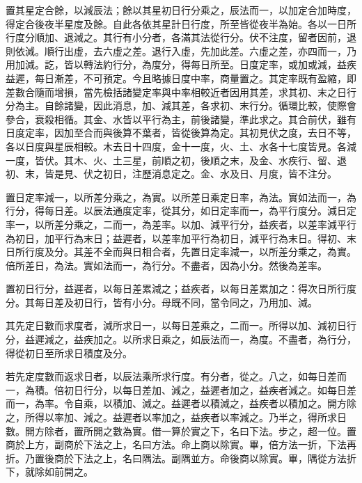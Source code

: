 \begin{pinyinscope}
 置其星定合餘，以減辰法；餘以其星初日行分乘之，辰法而一，以加定合加時度，得定合後夜半星度及餘。自此各依其星計日行度，所至皆從夜半為始。各以一日所行度分順加、退減之。其行有小分者，各滿其法從行分。伏不注度，留者因前，退則依減。順行出虛，去六虛之差。退行入虛，先加此差。六虛之差，亦四而一，乃用加減。訖，皆以轉法約行分，為度分，得每日所至。日度定率，或加或減，益疾益遲，每日漸差，不可預定。今且略據日度中率，商量置之。其定率既有盈縮，即差數合隨而增損，當先檢括諸變定率與中率相較近者因用其差，求其初、末之日行分為主。自餘諸變，因此消息，加、減其差，各求初、末行分。循環比較，使際會參合，衰殺相循。其金、水皆以平行為主，前後諸變，準此求之。其合前伏，雖有日度定率，因加至合而與後算不葉者，皆從後算為定。其初見伏之度，去日不等，各以日度與星辰相較。木去日十四度，金十一度，火、土、水各十七度皆見。各減一度，皆伏。其木、火、土三星，前順之初，後順之末，及金、水疾行、留、退初、末，皆是見、伏之初日，注歷消息定之。金、水及日、月度，皆不注分。



 置日定率減一，以所差分乘之，為實。以所差日乘定日率，為法。實如法而一，為行分，得每日差。以辰法通度定率，從其分，如日定率而一，為平行度分。減日定率一，以所差分乘之，二而一，為差率。以加、減平行分，益疾者，以差率減平行為初日，加平行為末日；益遲者，以差率加平行為初日，減平行為末日。得初、末日所行度及分。其差不全而與日相合者，先置日定率減一，以所差分乘之，為實。倍所差日，為法。實如法而一，為行分。不盡者，因為小分。然後為差率。



 置初日行分，益遲者，以每日差累減之；益疾者，以每日差累加之：得次日所行度分。其每日差及初日行，皆有小分。母既不同，當令同之，乃用加、減。



 其先定日數而求度者，減所求日一，以每日差乘之，二而一。所得以加、減初日行分，益遲減之，益疾加之。以所求日乘之，如辰法而一，為度。不盡者，為行分，得從初日至所求日積度及分。



 若先定度數而返求日者，以辰法乘所求行度。有分者，從之。八之，如每日差而一，為積。倍初日行分，以每日差加、減之，益遲者加之，益疾者減之。如每日差而一，為率。令自乘，以積加、減之。益遲者以積減之，益疾者以積加之。開方除之，所得以率加、減之。益遲者以率加之，益疾者以率減之。乃半之，得所求日數。開方除者，置所開之數為實。借一算於實之下，名曰下法。步之，超一位。置商於上方，副商於下法之上，名曰方法。命上商以除實。畢，倍方法一折，下法再折。乃置後商於下法之上，名曰隅法。副隅並方。命後商以除實。畢，隅從方法折下，就除如前開之。




\end{pinyinscope}
